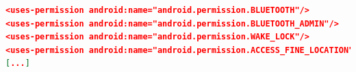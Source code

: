 \begin{lstlisting}[language=json, caption={}, captionpos=b]
<uses-permission android:name="android.permission.BLUETOOTH"/>
<uses-permission android:name="android.permission.BLUETOOTH_ADMIN"/>
<uses-permission android:name="android.permission.WAKE_LOCK"/>
<uses-permission android:name="android.permission.ACCESS_FINE_LOCATION"/>
[...]
\end{lstlisting}


